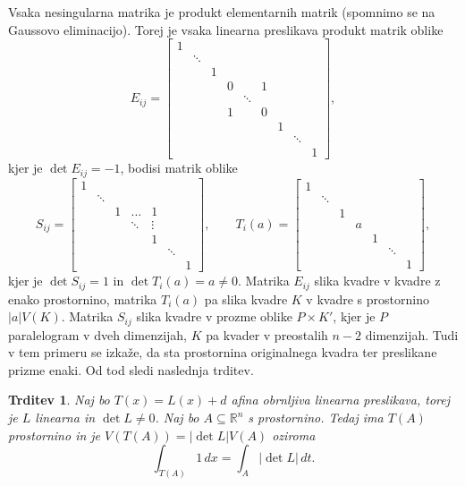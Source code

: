 \documentclass[10pt, a4paper]{article}
\newtheorem{trditev}[izr]{Trditev}
\newcommand{\R}{\mathbb {R}}
\begin{document}
Vsaka nesingularna matrika je produkt elementarnih matrik (spomnimo se na Gaussovo eliminacijo).
Torej je vsaka linearna preslikava produkt matrik oblike
$$E_{ij} = \begin{bmatrix}
    1 &  &  &  &  &  & & \\
    & \ddots & & & & & & \\
    & & 1 & & & & & \\
    & & & 0 & & 1 & & \\
    & & & & \ddots & & & \\
    & & & 1 & & 0 & & \\
    & & & & & & 1 & & \\
    & & & & & & & \ddots & \\
    & & & & & & & & 1
\end{bmatrix},$$
kjer je $\det E_{ij} = -1$, bodisi matrik oblike 
$$S_{ij} = \begin{bmatrix}
    1 &&&&&&\\
    & \ddots &&&&&\\
    && 1 & \dots & 1 &&\\
    &&& \ddots & \vdots &&\\
    &&&& 1 &&\\
    &&&&& \ddots\\
    &&&&&&1
\end{bmatrix}, \qquad T_i (a) = \begin{bmatrix}
    1 &&&&&\\
    & \ddots &&&&\\
    && 1 &&&\\
    &&& a &&\\
    &&&& 1 &\\
    &&&&& \ddots\\
    &&&&&& 1
\end{bmatrix},$$
kjer je $\det S_{ij} = 1$ in $\det T_i(a) = a \neq 0$.
Matrika $E_{ij}$ slika kvadre v kvadre z enako prostornino,
matrika $T_i (a)$ pa slika kvadre $K$ v kvadre s prostornino $|a| V(K)$.
Matrika $S_{ij}$ slika kvadre v prozme oblike $P \times K'$,
kjer je $P$ paralelogram v dveh dimenzijah, $K$ pa kvader v preostalih $n - 2$ dimenzijah.
Tudi v tem primeru se izkaže, da sta prostornina originalnega kvadra ter preslikane prizme enaki.
Od tod sledi naslednja trditev.

\begin{trditev}
    Naj bo $T(x) = L(x) + d$ afina obrnljiva linearna preslikava,
    torej je $L$ linearna in $\det L \neq 0$. Naj bo $A \subseteq \R^n$ s prostornino.
    Tedaj ima $T(A)$ prostornino in je $V(T(A)) = |\det L| V(A)$ oziroma 
    $$\int_{T(A)} 1\, dx = \int_A |\det L|\, dt.$$
\end{trditev}
\end{document}
